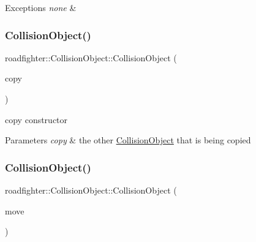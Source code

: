 \begin{DoxyExceptions}{Exceptions}
{\em none} & \\
\hline
\end{DoxyExceptions}
\mbox{\label{classroadfighter_1_1CollisionObject_ac19de6256e1421e1c91e98e3ba136326}} 
\subsubsection{\texorpdfstring{Collision\+Object()}{CollisionObject()}\hspace{0.1cm}{\footnotesize\ttfamily [3/4]}}
{\footnotesize\ttfamily roadfighter\+::\+Collision\+Object\+::\+Collision\+Object (\begin{DoxyParamCaption}\item[{const \hyperlink{classroadfighter_1_1CollisionObject}{Collision\+Object} \&}]{copy }\end{DoxyParamCaption})\hspace{0.3cm}{\ttfamily [default]}}

copy constructor 
\begin{DoxyParams}{Parameters}
{\em copy} & the other \hyperlink{classroadfighter_1_1CollisionObject}{Collision\+Object} that is being copied \\
\hline
\end{DoxyParams}
\mbox{\label{classroadfighter_1_1CollisionObject_a45af317bbabd99cf64e0ba87241df509}} 
\subsubsection{\texorpdfstring{Collision\+Object()}{CollisionObject()}\hspace{0.1cm}{\footnotesize\ttfamily [4/4]}}
{\footnotesize\ttfamily roadfighter\+::\+Collision\+Object\+::\+Collision\+Object (\begin{DoxyParamCaption}\item[{\hyperlink{classroadfighter_1_1CollisionObject}{Collision\+Object} \&\&}]{move }\end{DoxyParamCaption})\hspace{0.3cm}{\ttfamily [default]}}

